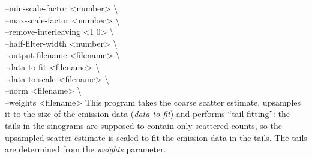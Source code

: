 \documentclass{article}
\begin{document}
{{{{					--min-scale-factor <number> \textbackslash \\
					--max-scale-factor <number> \textbackslash \\
					--remove-interleaving <1|0> \textbackslash \\
					--half-filter-width <number> \textbackslash \\
					--output-filename <filename> \textbackslash \\
					--data-to-fit <filename> \textbackslash \\
					--data-to-scale <filename> \textbackslash \\
					--norm <filename> \textbackslash \\
					--weights <filename>%
}
This program takes the coarse scatter estimate, upsamples it to the size of the emission data (\textit{data-to-fit}) and 
performs ``tail-fitting'': the tails in the sinograms are supposed to contain only scattered counts, so the upsampled
scatter estimate is scaled to fit the emission data in the tails. The tails are determined from the \textit{weights}
parameter.

}}}
\end{document}
